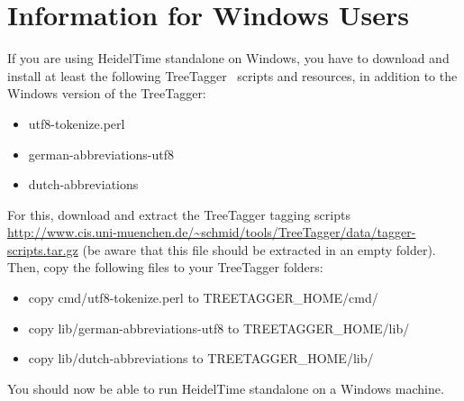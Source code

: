 \appendix
\section{Information for Windows Users}\label{app:windows}
If you are using HeidelTime standalone on Windows, you have to download and install at least the following TreeTagger~\cite{TreeTagger} scripts and resources, in addition to the Windows version of the TreeTagger:
\begin{itemize}
 \item utf8-tokenize.perl
 \item german-abbreviations-utf8
 \item dutch-abbreviations
\end{itemize}

For this, download and extract the TreeTagger tagging scripts\\
 \url{http://www.cis.uni-muenchen.de/~schmid/tools/TreeTagger/data/tagger-scripts.tar.gz} (be aware that this file should be extracted in an empty folder). Then, copy the following files to your TreeTagger folders:
\begin{itemize}
 \item copy cmd/utf8-tokenize.perl to TREETAGGER\_HOME/cmd/
 \item copy lib/german-abbreviations-utf8 to TREETAGGER\_HOME/lib/
 \item copy lib/dutch-abbreviations to TREETAGGER\_HOME/lib/
\end{itemize}

You should now be able to run HeidelTime standalone on a Windows machine.
